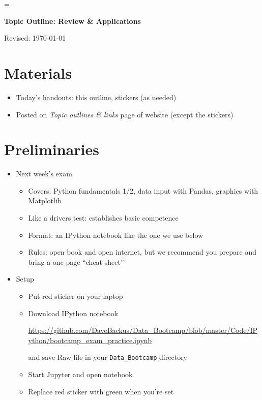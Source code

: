 \documentclass[11pt]{article}
\begin{document}
\parskip=\bigskipamount
\parindent=0.0in
\thispagestyle{empty}


\bigskip\bigskip
\centerline{\Large \bf Topic Outline:  Review \& Applications}
\centerline{Revised: \today}

\section*{Materials}

\begin{itemize}
\item  Today's handouts:  this outline, stickers (as needed)
\item  Posted on {\it Topic outlines \& links\/} page of website (except the stickers)
\end{itemize}

\section*{Preliminaries}

\begin{itemize}
\item Next week's exam
\begin{itemize}
\item Covers:  Python fundamentals 1/2, data input with Pandas, graphics with Matplotlib
\item Like a drivers test:  establishes basic competence
\item Format:  an IPython notebook like the one we use below
\item Rules:  open book and open internet, but we recommend you prepare and bring a one-page ``cheat sheet''
\end{itemize}

\item {Setup}
\begin{itemize}
\item Put red sticker on your laptop

\item Download IPython notebook

\url{https://github.com/DaveBackus/Data_Bootcamp/blob/master/Code/IPython/bootcamp_exam_practice.ipynb} %

and save Raw file in your \verb|Data_Bootcamp| directory
\item Start Jupyter and open notebook
\item Replace red sticker with green when you're set
\end{itemize}

\end{itemize}
\end{document}
